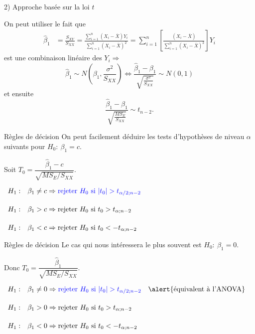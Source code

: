 \documentclass{BeamerTemplate}
\begin{document}
\begin{frame}[t]{2) Approche basée sur la loi $t$}

{\small
On peut utiliser le fait que
\begin{align*}
\hat{\beta}_1&=\frac{S_{XY}}{S_{XX}}=\frac{\sum_{i=1}^n(X_i-\overline{X})Y_i}{\sum_{i=1}^n(X_i-\overline{X})^2}
=\sum_{i=1}^n\left[\frac{(X_i-\overline{X})}{\sum_{i=1}^n(X_i-\overline{X})^2}\right]Y_i
\end{align*}
est une combinaison linéaire des $Y_i\Rightarrow$
$$
\hat{\beta}_1\sim N\left(\beta_1,\frac{\sigma^2}{S_{XX}}\right)\Leftrightarrow
\frac{\hat{\beta}_1-\beta_1}{\sqrt{\frac{\sigma^2}{S_{XX}}}}\sim N(0,1)
$$
et ensuite
\alert{$$
\frac{\hat{\beta}_1-\beta_1}{\sqrt{\frac{MS_E}{S_{XX}}}}\sim t_{n-2}.
$$}

}
\end{frame}

\begin{frame}[t]{Règles de décision}
On peut facilement déduire les tests
d'hypothèses de niveau $\alpha$ suivants pour $H_0:~\beta_1=c$.
\medskip

Soit $T_0=\dfrac{\hat{\beta}_1-c}{\sqrt{MS_E/S_{XX}}}$.

\bigskip
$\begin{array}{llr}
H_1:&\beta_1\neq c\Rightarrow{\color{blue}{\text{rejeter $H_0$ si\ }|t_0|>t_{\alpha/2;n-2}}}& \\[5mm]
H_1:&\beta_1> c\Rightarrow\text{rejeter $H_0$ si\ }t_0>t_{\alpha;n-2}&\\[5mm]
H_1:&\beta_1< c\Rightarrow\text{rejeter $H_0$ si\ }t_0<-t_{\alpha;n-2}&
\end{array}$

\end{frame}

\begin{frame}[t]{Règles de décision}
Le cas qui nous intéressera le plus souvent est $H_0:~\beta_1=0$.
\medskip

Donc $T_0=\dfrac{\hat{\beta}_1}{\sqrt{MS_E/S_{XX}}}$.

\bigskip
$\begin{array}{llr}
H_1:&\beta_1\neq 0\Rightarrow{\color{blue}{\text{rejeter $H_0$ si\ }|t_0|>t_{\alpha/2;n-2}}}& \alert{\text{équivalent à l'ANOVA}}\\[5mm]
H_1:&\beta_1> 0\Rightarrow\text{rejeter $H_0$ si\ }t_0>t_{\alpha;n-2}&\\[5mm]
H_1:&\beta_1< 0\Rightarrow\text{rejeter $H_0$ si\ }t_0<-t_{\alpha;n-2}&
\end{array}$

\end{frame}
\end{document}
